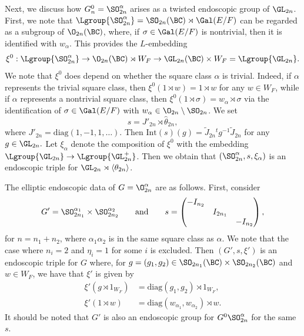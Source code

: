 \documentclass[11pt,letterpaper]{amsart}
\numberwithin{equation}{section}
\begin{document}
{Next, we discuss how $G_n^0=\SO_{2n}^\alpha$ arises as a twisted endoscopic group of $\GL_{2n}$. First, we note that $\Lgroup{\SO_{2n}^\alpha}=\SO_{2n}(\BC)\rtimes \Gal(E/F)$ can be regarded as a subgroup of $\O_{2n}(\BC)$, where, if $\sigma\in\Gal(E/F)$ is nontrivial, then it is identified with $w_\alpha.$ This provides 
the $L$-embedding
\[
\xi^0:\Lgroup{\SO_{2n}^\alpha} \rightarrow \O_{2n}(\BC)\rtimes W_F\rightarrow \GL_{2n}(\BC)\times W_F=\Lgroup{\GL_{2n}}.
\]
We note that $\xi^0$ does depend on whether the square class $\alpha$ is trivial. Indeed, if $\alpha$ represents the trivial square class, then $\xi^0(1\rtimes w)=1\rtimes w$ for any $w\in W_F$, while if $\alpha$ represents a nontrivial square class, then $\xi^0(1\rtimes \sigma)=w_\alpha\rtimes \sigma$ via the identification of $\sigma\in\Gal(E/F)$ with $w_\alpha\in \O_{2n} \setminus \SO_{2n}$. 
We set \begin{equation}\label{eqn: s for SO even}
    s=J'_{2n}\rtimes \hat{\theta}_{2n},
\end{equation} where $J'_{2n}=\mathrm{diag}(1,-1,1,\dots).$
Then $\mathrm{Int}(s)(g)=\tilde{J}_{2n}{}^tg^{-1}\tilde{J}_{2n}$ for any $g\in \GL_{2n}.$ Let $\xi_\alpha$ denote the composition of $\xi^0$ with the embedding $\Lgroup{\GL_{2n}}\rightarrow\Lgroup{\GL_{2n}^+}$.
Then we obtain that $(\SO_{2n}^\alpha, s, \xi_\alpha)$ is an endoscopic triple for $\GL_{2n}\rtimes \langle\theta_{2n}\rangle$.
}


The elliptic endoscopic data of $G=\O^{\alpha}_{2n}$ are as follows. 
First, consider
\begin{equation}\label{equation: s D}
G' = \SO_{2n_1}^{\alpha_1} \times \SO_{2n_2}^{\alpha_2}
\qquad\text{and}\qquad
s=\begin{pmatrix}
-I_{n_2}&&\\
&I_{2{n_1}}&\\
&&-I_{n_2}
\end{pmatrix},
\end{equation}
for $n=n_1+n_2$, where $\alpha_1 \alpha_2$ is in the same square class as $\alpha$. We note that the case where $n_i=2$ and $\eta_i=1$ for some $i$ is excluded.
Then $(G',s,\xi')$ is an endoscopic triple for $G$ where, for $g=(g_1,g_2)\in \SO_{2n_1}(\BC)\times\SO_{2n_2}(\BC)$ and $w\in W_F$, we have that $\xi'$ is given by
\begin{align*}
\xi'(g\rtimes 1_{W_F})&= \mathrm{diag}(g_1,g_2) \rtimes 1_{W_F}, \\
\xi'(1\rtimes w)&= \mathrm{diag}(w_{\alpha_1},w_{\alpha_2}) \rtimes w.
\end{align*}
It should be noted that $G'$ is also an endoscopic group for $G^0 \SO^{\alpha}_{2n}$ for the same $s$.
\end{document}
